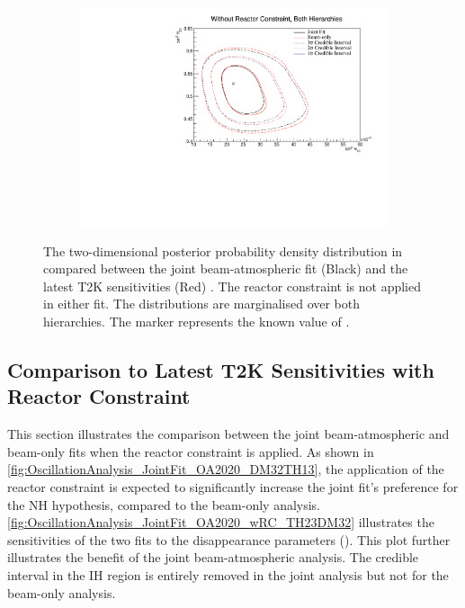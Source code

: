 \begin{figure}[h]
  \begin{subfigure}[t]{0.98\textwidth}
    \includegraphics[width=\textwidth, trim={0mm 0mm 0mm 0mm}, clip,page=1]{Figures/OA/JointFit_OA2020_Comp/ContourComparison_2D_th13_th23_BH_1_woRC_UnSmeared_CredibleInterval.pdf}
  \end{subfigure}
  \caption{The two-dimensional posterior probability density distribution in  compared between the joint beam-atmospheric fit (Black) and the latest T2K sensitivities (Red) \cite{Dunne2020-uf, t2k_tn_393}. The reactor constraint is not applied in either fit. The distributions are marginalised over both hierarchies. The marker represents the known value of .}
  \label{fig:OscillationAnalysis_JointFit_OA2020_TH13TH23}
\end{figure}

\clearpage
\subsection{Comparison to Latest T2K Sensitivities with Reactor Constraint}
\label{sec:OscillationAnalysis_JointFit_OA2020_wRC}
This section illustrates the comparison between the joint beam-atmospheric and beam-only fits when the reactor constraint is applied. As shown in \autoref{fig:OscillationAnalysis_JointFit_OA2020_DM32TH13}, the application of the reactor constraint is expected to significantly increase the joint fit's preference for the NH hypothesis, compared to the beam-only analysis. \autoref{fig:OscillationAnalysis_JointFit_OA2020_wRC_TH23DM32} illustrates the sensitivities of the two fits to the disappearance parameters (). This plot further illustrates the benefit of the joint beam-atmospheric analysis. The \quickmath{1\sigma} credible interval in the IH region is entirely removed in the joint analysis but not for the beam-only analysis.

